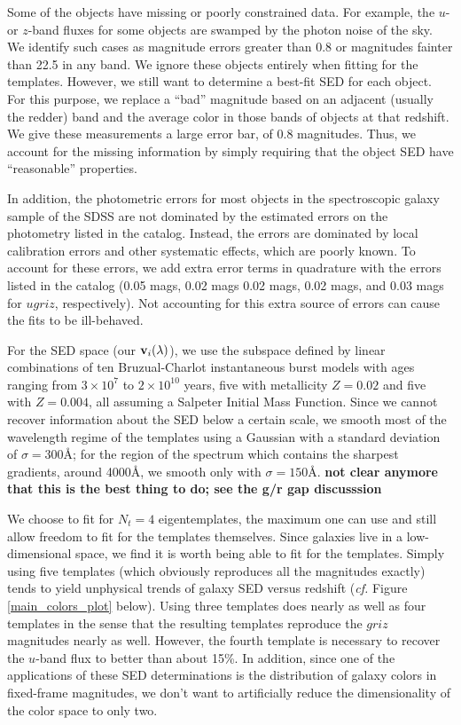 \documentclass[10pt,preprint]{aastex}
\newcommand{\vv}[1]{{\bf #1}}
\begin{document}
Some of the objects have missing or poorly constrained data. For
example, the $u$- or $z$-band fluxes for some objects are swamped by
the photon noise of the sky. We identify such cases as magnitude
errors greater than 0.8 or magnitudes fainter than 22.5 in any
band. We ignore these objects entirely when fitting for the
templates. However, we still want to determine a best-fit SED for each
object. For this purpose, we replace a ``bad'' magnitude based on an
adjacent (usually the redder) band and the average color in those
bands of objects at that redshift. We give these measurements a large
error bar, of 0.8 magnitudes. Thus, we account for the missing
information by simply requiring that the object SED have
``reasonable'' properties.

In addition, the photometric errors for most objects in the
spectroscopic galaxy sample of the SDSS are not dominated by the
estimated errors on the photometry listed in the catalog. Instead, the
errors are dominated by local calibration errors and other systematic
effects, which are poorly known. To account for these errors, we add
extra error terms in quadrature with the errors listed in the catalog
(0.05 mags, 0.02 mags 0.02 mags, 0.02 mags, and 0.03 mags for $ugriz$,
respectively). Not accounting for this extra source of errors can
cause the fits to be ill-behaved.

For the SED space (our $\vv{v}_i(\lambda)$), we use the subspace
defined by linear combinations of ten Bruzual-Charlot instantaneous
burst models with ages ranging from $3 \times 10^7$ to $2\times
10^{10}$ years, five with metallicity $Z=0.02$ and five with
$Z=0.004$, all assuming a Salpeter Initial Mass Function. Since we
cannot recover information about the SED below a certain scale, we
smooth most of the wavelength regime of the templates using a Gaussian
with a standard deviation of $\sigma = 300$\AA; for the region of the
spectrum which contains the sharpest gradients, around 4000\AA, we
smooth only with $\sigma = 150$\AA. {\bf not clear anymore that this
is the best thing to do; see the g/r gap discusssion}

We choose to fit for $N_t = 4$ eigentemplates, the maximum one can use
and still allow freedom to fit for the templates themselves. Since
galaxies live in a low-dimensional space, we find it is worth being
able to fit for the templates. Simply using five templates (which
obviously reproduces all the magnitudes exactly) tends to yield
unphysical trends of galaxy SED versus redshift ({\it cf.}  Figure
\ref{main_colors_plot} below). Using three templates does nearly as well as
four templates in the sense that the resulting templates reproduce the
$griz$ magnitudes nearly as well. However, the fourth template is
necessary to recover the $u$-band flux to better than about 15\%. In
addition, since one of the applications of these SED determinations is
the distribution of galaxy colors in fixed-frame magnitudes, we don't
want to artificially reduce the dimensionality of the color space to
only two.
\end{document}
